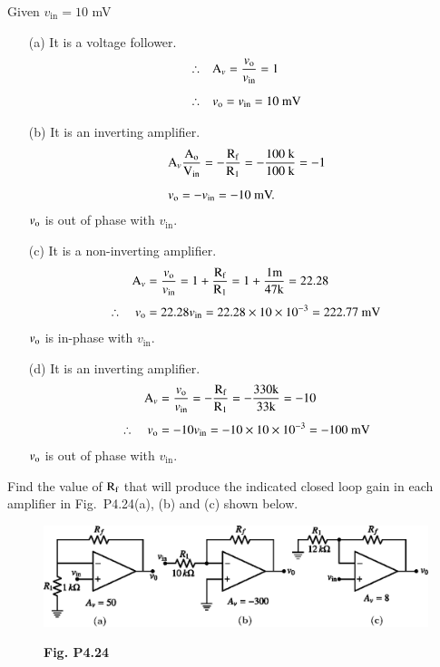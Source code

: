 \begin{solution}
Given $v_{\text{in}}=10$ mV
\begin{itemize}
\item[(a)] It is a voltage follower.
\begin{align*}
\therefore\quad & \textrm{A}_{v}=\frac{v_{\textrm{o}}}{v_{\text{in}}}=1\\[5pt]
\therefore\quad & v_{\textrm{o}}=v_{\text{in}}=10\text{~mV}
\end{align*}

\item[(b)] It is an inverting amplifier.
\begin{align*}
& \textrm{A}_{v} \frac{\textrm{A}_{\textrm{o}}}{\textrm{V}_{\text{in}}}=-\frac{\textrm{R}_{\textrm{f}}}{\textrm{R}_{1}}=-\frac{100\text{~k}}{100\text{~k}}=-1\\[5pt]
& v_{\textrm{o}}=-v_{\text{in}}=-10\text{~mV.}
\end{align*}
$v_{\textrm{o}}$ is out of phase with $v_{\text{in}}$.

\eject

\item[(c)] It is a non-inverting amplifier.
\begin{align*}
\textrm{A}_{v} &= \frac{v_{\textrm{o}}}{v_{\text{in}}}=1+\frac{\textrm{R}_{\textrm{f}}}{\textrm{R}_{1}}=1+\frac{1\textrm{m}}{47\textrm{k}}=22.28\\[4pt]
\therefore\quad v_{\textrm{o}} &= 22.28 v_{\text{in}}=22.28\times 10\times 10^{-3}=222.77\text{~mV}
\end{align*}
$v_{\textrm{o}}$ is in-phase with $v_{\text{in}}$.

\item[(d)] It is an inverting amplifier.
\begin{align*}
\textrm{A}_{v} &= \frac{v_{\textrm{o}}}{v_{\text{in}}}=-\frac{\textrm{R}_{\textrm{f}}}{\textrm{R}_{1}}=-\frac{330\textrm{k}}{33\textrm{k}}=-10\\[4pt]
\therefore\quad v_{\textrm{o}} &=-10v_{\text{in}}=-10\times 10\times 10^{-3}=-100\text{~mV}
\end{align*}
$v_{\textrm{o}}$ is out of phase with $v_{\text{in}}$.
\end{itemize}
\end{solution}

\begin{problem}\label{prob4.24}
Find the value of $\textrm{R}_{\textrm{f}}$ that will produce the indicated closed loop gain in each amplifier in Fig.~P4.24(a), (b) and (c) shown below.
\begin{figure}[H]
\centering
\includegraphics{chap4/figP4.24.eps}

\smallskip
{\bf Fig. P4.24}
\end{figure}
\end{problem}

